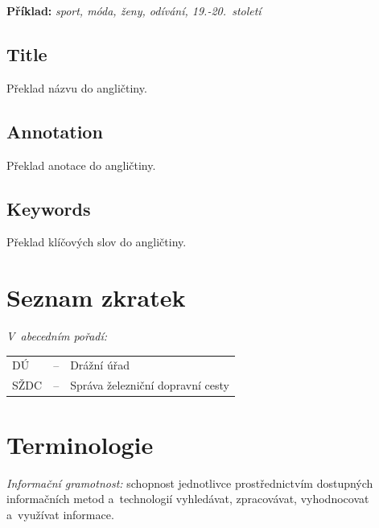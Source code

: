 \documentclass[12pt,a4paper]{report}															%
\begin{document}
\textbf{Příklad:} \textit{sport, móda, ženy, odívání, 19.-20.~století}

\section*{Title}
Překlad názvu do angličtiny.																	%

\section*{Annotation}
Překlad anotace do angličtiny.																	%

\section*{Keywords}
Překlad klíčových slov do angličtiny.															%
\thispagestyle{empty}


\tableofcontents


\listoffigures

\listoftables

\chapter*{Seznam zkratek}
\textit{V~abecedním pořadí:}

\begin{tabular}{ p{2cm} p{0.5cm} p{12cm} }
DÚ & -- & Drážní úřad\\ [1.242ex]																%
SŽDC & -- & Správa železniční dopravní cesty\\ [1.242ex]
\end{tabular}

\chapter*{Terminologie}
\textit{Informační gramotnost:} schopnost jednotlivce prostřednictvím dostupných informačních metod a~technologií vyhledávat, zpracovávat, vyhodnocovat a~využívat informace.
\thispagestyle{empty}
\end{document}
